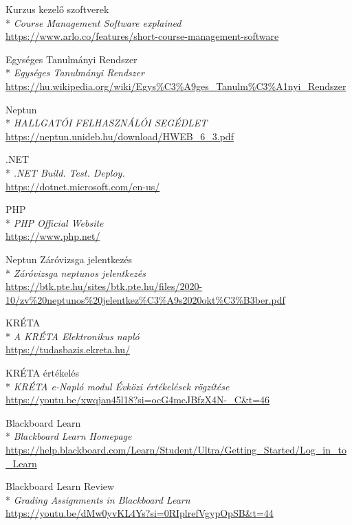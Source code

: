 \begin{thebibliography}{x}



 Kurzus kezelő szoftverek\\*
\textit{Course Management Software explained}
\\ \url{https://www.arlo.co/features/short-course-management-software}

 Egységes Tanulmányi Rendszer\\*
\textit{Egységes Tanulmányi Rendszer}
\\ \url{https://hu.wikipedia.org/wiki/Egys%C3%A9ges_Tanulm%C3%A1nyi_Rendszer}

 Neptun\\*
\textit{HALLGATÓI FELHASZNÁLÓI SEGÉDLET}
\\ \url{https://neptun.unideb.hu/download/HWEB_6_3.pdf}

 .NET\\*
\textit{.NET Build. Test. Deploy.}
\\ \url{https://dotnet.microsoft.com/en-us/}

 PHP\\*
\textit{PHP Official Website}
\\ \url{https://www.php.net/}

 Neptun Záróvizsga jelentkezés\\*
\textit{Záróvizsga neptunos jelentkezés}
\\ \url{https://btk.pte.hu/sites/btk.pte.hu/files/2020-10/zv%20neptunos%20jelentkez%C3%A9s2020okt%C3%B3ber.pdf}

 KRÉTA\\*
\textit{A KRÉTA Elektronikus napló}
\\ \url{https://tudasbazis.ekreta.hu/}

 KRÉTA értékelés\\*
\textit{KRÉTA e-Napló modul Évközi értékelések rögzítése}
\\ \url{https://youtu.be/xwqjan45l18?si=ocG4mcJBfzX4N-_C&t=46}

 Blackboard Learn\\*
\textit{Blackboard Learn Homepage}
\\ \url{https://help.blackboard.com/Learn/Student/Ultra/Getting_Started/Log_in_to_Learn}

 Blackboard Learn Review\\*
\textit{Grading Assignments in Blackboard Learn}
\\ \url{https://youtu.be/dMw0yvKL4Ys?si=0RIplrefVgypOpSB&t=44}


\end{thebibliography}
